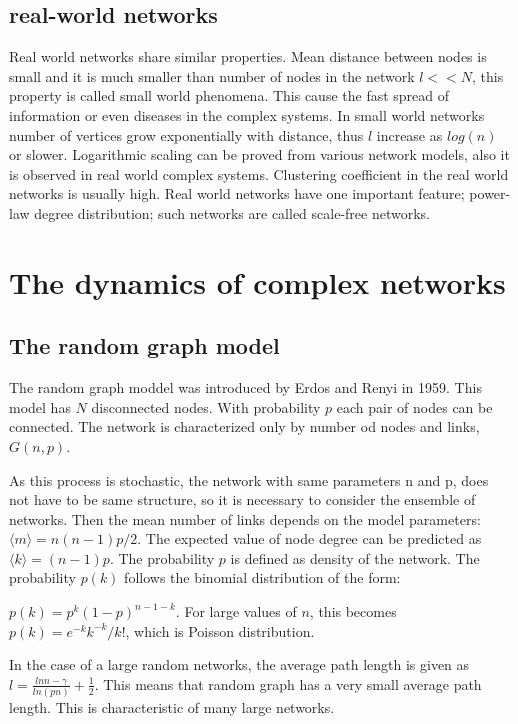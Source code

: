 \subsection{real-world networks}
Real world networks share similar properties. Mean distance between nodes is small and it is much smaller than number of nodes in the network $l << N$, this property is called small world phenomena. This cause the fast spread of information or even diseases in the complex systems. In small world networks number of vertices grow exponentially with distance, thus $l$ increase as $log(n)$ or slower. Logarithmic scaling can be proved from various network models, also it is observed in real world complex systems. Clustering coefficient in the real world networks is usually high. Real world networks have one important feature; power-law degree distribution; such networks are called scale-free networks.

\section{The dynamics of complex networks}

\subsection{The random graph model }

The random graph moddel was introduced by Erdos and Renyi in 1959. This model has $N$ disconnected nodes. With probability $p$ each pair of nodes can be connected.  The network is characterized only by number od nodes and links, $G(n, p)$. 

As this process is stochastic, the network with same parameters n and p, does not have to be same structure, so it is necessary to consider the ensemble of networks. Then the mean number of links depends on the model parameters:
$\langle m \rangle = n(n-1)p / 2$. The expected value of node degree can be predicted as $\langle k \rangle = (n-1)p$.
The probability $p$ is defined as density of the network. 
The probability $p(k)$ follows the binomial distribution of the form:

$p(k) = p^k(1-p)^{n-1-k}$. For large values of $n$, this becomes $p(k) = e^{-k}k^{-k} / k!$, which is Poisson distribution. 

In the case of a large random networks, the average path length is given as $l = \frac{ln n - \gamma}{ln(pn)} + \frac{1}{2}$. This means that random graph has a very small average path length. This is characteristic of many large networks. 

